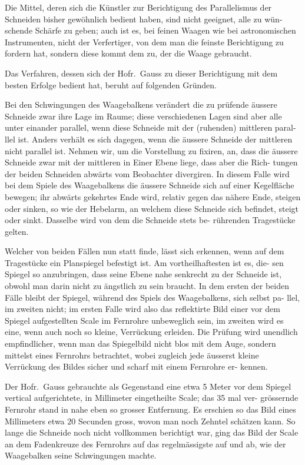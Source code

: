 \documentclass[12pt,a4paper]{article}
\begin{document}
Die Mittel, deren sich die Künstler zur Berichtigung des Parallelismus der 
Schneiden bisher gewöhnlich bedient haben, sind nicht geeignet, alle zu wün-
schende Schärfe zu geben; auch ist es, bei feinen Waagen wie bei astronomischen 
Instrumenten, nicht der Verfertiger, von dem man die feinste Berichtigung zu 
fordern hat, sondern diese kommt dem zu, der die Waage gebraucht.

Das Verfahren, dessen sich der Hofr.\ Gauss zu dieser Berichtigung mit 
dem besten Erfolge bedient hat, beruht auf folgenden Gründen.

Bei den Schwingungen des Waagebalkens verändert die zu prüfende äussere 
Schneide zwar ihre Lage im Raume; diese verschiedenen Lagen sind aber alle 
unter einander parallel, wenn diese Schneide mit der (ruhenden) mittleren paral-
llel ist. Anders verhält es sich dagegen, wenn die äussere Schneide der mittleren 
nicht parallel ist. Nehmen wir, um die Vorstellung zu fixiren, an, dass die 
äussere Schneide zwar mit der mittleren in Einer Ebene liege, dass aber die Rich-
tungen der beiden Schneiden abwärts vom Beobachter divergiren. In diesem 
Falle wird bei dem Spiele des Waagebalkens die äussere Schneide sich auf einer 
Kegelfläche bewegen; ihr abwärts gekehrtes Ende wird, relativ gegen das nähere 
Ende, steigen oder sinken, so wie der Hebelarm, an welchem diese Schneide 
sich befindet, steigt oder sinkt. Dasselbe wird von dem die Schneide stets be-
rührenden Tragestücke gelten.

Welcher von beiden Fällen nun statt finde, lässt sich erkennen, wenn auf 
dem Tragestücke ein Planspiegel befestigt ist. Am vortheilhaftesten ist es, die-
sen Spiegel so anzubringen, dass seine Ebene nahe senkrecht zu der Schneide ist, 
obwohl man darin nicht zu ängstlich zu sein braucht. In dem ersten der beiden 
Fälle bleibt der Spiegel, während des Spiels des Waagebalkens, sich selbst pa-
llel, im zweiten nicht; im ersten Falle wird also das
reflektirte Bild einer vor dem Spiegel aufgestellten Scale im Fernrohre unbeweglich 
sein, im zweiten wird es eine, wenn auch noch so kleine, Verrückung erleiden. 
Die Prüfung wird unendlich empfindlicher, wenn man das Spiegelbild nicht blos 
mit dem Auge, sondern mittelst eines Fernrohrs betrachtet, wobei zugleich jede 
äusserst kleine Verrückung des Bildes sicher und scharf mit einem Fernrohre er-
kennen.

Der Hofr.\ Gauss gebrauchte als Gegenstand eine etwa 5 Meter vor dem 
Spiegel vertical aufgerichtete, in Millimeter eingetheilte Scale; das 35 mal ver-
grössernde Fernrohr stand in nahe eben so grosser Entfernung. Es erschien so 
das Bild eines Millimeters etwa 20 Secunden gross, wovon man noch Zehntel 
schätzen kann. So lange die Schneide noch nicht vollkommen berichtigt war, 
ging das Bild der Scale an dem Fadenkreuze des Fernrohrs auf das regelmässigste 
auf und ab, wie der Waagebalken seine Schwingungen machte.
\end{document}
